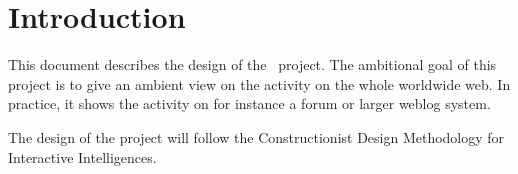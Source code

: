 \chapter{Introduction}

This document describes the design of the \AmbE\ project. The ambitional goal
of this project is to give an ambient view on the activity on the whole
worldwide web. In practice, it shows the activity on for instance a forum or
larger weblog system.

The design of the project will follow the Constructionist Design
Methodology for Interactive Intelligences\cite{CDM}.
